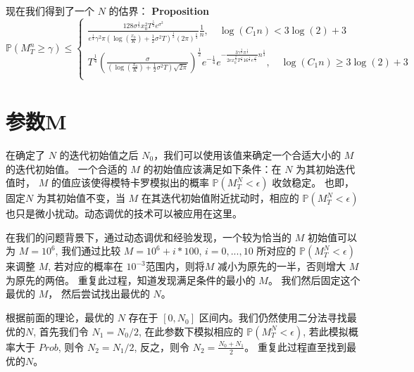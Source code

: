  现在我们得到了一个 $N$ 的估界：
 \textbf{Proposition}
 \begin{equation}
 \mathbb{P}(M_T^n\geq \gamma)\leq 
 \begin{cases}
 \frac{128\sigma^{\frac{1}{2}}x_0^2T^{\frac{5}{4}}e^{\sigma^2}}{e^{\frac{1}{4}}\gamma^2\pi (\log(\frac{x_0}{K})+\frac{1}{2}\sigma^2T)^{\frac{1}{2}}(2\pi)^{\frac{1}{4}}}\frac{1}{n}, \quad \log(C_1n)<3\log(2)+3\\
 T^{\frac{1}{4}}(\frac{\sigma}{(\log(\frac{x_0}{K})+\frac{1}{2}\sigma^2T)\sqrt{2\pi}})^{\frac{1}{2}}e^{-\frac{1}{4}}e^{-\frac{3\gamma^{\frac{2}{3}}\pi^{\frac{1}{3}}}{2ex_0^{\frac{2}{3}}T^{\frac{1}{3}}16^{\frac{1}{3}}e^{\frac{\sigma^2}{3}}}n^{\frac{1}{3}}}, \quad \log(C_1n)\geq 3\log(2)+3\\
 \end{cases}
 \end{equation}



\section{参数M} %
\label{sec:M}
在确定了 $N$ 的迭代初始值之后 $N_0$，我们可以使用该值来确定一个合适大小的 $M$ 的迭代初始值。
一个合适的 $M$ 的初始值应该满足如下条件：在 $N$ 为其初始迭代值时， $M$ 的值应该使得模特卡罗模拟出的概率 $\mathbb{P}(M_T^N<\epsilon)$ 收敛稳定。
也即，固定$N$ 为其初始值不变，当 $M$ 在其迭代初始值附近扰动时，相应的 $\mathbb{P}(M_T^N<\epsilon)$ 也只是微小扰动。动态调优的技术可以被应用在这里。

在我们的问题背景下，通过动态调优和经验发现，一个较为恰当的 $M$ 初始值可以为 $M=10^6$, 我们通过比较 $M=10^6+i*100$, $i=0,...,10$ 
所对应的 $\mathbb{P}(M_T^N<\epsilon)$来调整 $M$, 若对应的概率在 $10^{-3}$范围内，则将$M$ 减小为原先的一半，否则增大 $M$ 为原先的两倍。
重复此过程，知道发现满足条件的最小的 $M$。 我们然后固定这个最优的 $M$， 然后尝试找出最优的 $N$。

根据前面的理论，最优的 $N$ 存在于 $[0, N_0]$ 区间内。我们仍然使用二分法寻找最优的$N$, 首先我们令 $N_1=N_0/2$, 在此参数下模拟相应的
$\mathbb{P}(M_T^N<\epsilon)$, 若此模拟概率大于 $Prob$, 则令 $N_2=N_1/2$, 反之，则令 $N_2=\frac{N_0+N_1}{2}$。
重复此过程直至找到最优的$N$。





